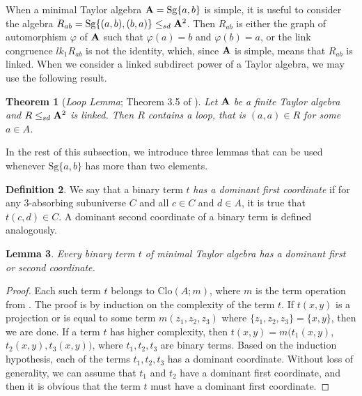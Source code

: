\documentclass[11pt]{amsart}
\newcommand{\m}[1]{\mathbf{\uppercase{#1}}}
\newtheorem{thm}{Theorem}
\newtheorem{lem}[thm]{Lemma}
\theoremstyle{definition}
\newtheorem{dfn}[thm]{Definition}
\theoremstyle{remark}
\theoremstyle{plain}
\begin{document}
When a minimal Taylor algebra ${\m A}=\mathrm{Sg}\{a,b\}$ is simple, it is useful to consider the algebra $R_{ab}=\mathrm{Sg}\{(a,b),(b,a)\}\leq_{sd} {\m A}^2$. Then $R_{ab}$ is either the graph of automorphism $\varphi$ of ${\m A}$ such that $\varphi (a)=b$ and $\varphi (b)=a$, or the link congruence $lk_1 R_{ab}$ is not the identity, which, since $\m a$ is simple, means that $R_{ab}$ is linked. When we consider a linked subdirect power of a Taylor algebra, we may use the following result.

\begin{thm}[\emph{Loop Lemma}; Theorem 3.5 of \cite{BartoKozik}]\label{looplemma}
Let $\m a$ be a finite Taylor algebra and $R\leq_{sd}\m a^2$ is linked. Then $R$ contains a loop, that is $(a,a)\in R$ for some $a\in A$.
\end{thm}

In the rest of this subsection, we introduce three lemmas that can be used whenever $\mathrm{Sg}\{a,b\}$ has more than two elements.

\begin{dfn}
We say that a binary term $t$ {\em has a dominant first coordinate }if for any $3$-absorbing subuniverse $C$ and all $c\in C$ and $d\in A$, it is true that $t(c,d)\in C$. A dominant second coordinate of a binary term is defined analogously.
\end{dfn}

\begin{lem}\label{dominant}
Every binary term $t$ of minimal Taylor algebra has a dominant first or second coordinate.
\end{lem}

\begin{proof}
Each such term $t$ belongs to $\mathrm{Clo}(A;m)$, where $m$ is the term operation from . The proof is by induction on the complexity of the term $t$. If $t(x,y)$ is a projection or is equal to some term $m(z_1,z_2,z_3)$ where $\{z_1,z_2,z_3\}=\{x,y\}$, then we are done. If a term $t$ has higher complexity, then $t(x,y)=m(t_1(x,y)$, $t_2(x,y), t_3(x,y))$, where $t_1, t_2, t_3$ are binary terms. Based on the induction hypothesis, each of the terms $t_1,t_2,t_3$ has a dominant coordinate. Without loss of generality, we can assume that $t_1$ and $t_2$ have a dominant first coordinate, and then it is obvious that the term $t$ must have a dominant first coordinate.
\end{proof}
\end{document}
